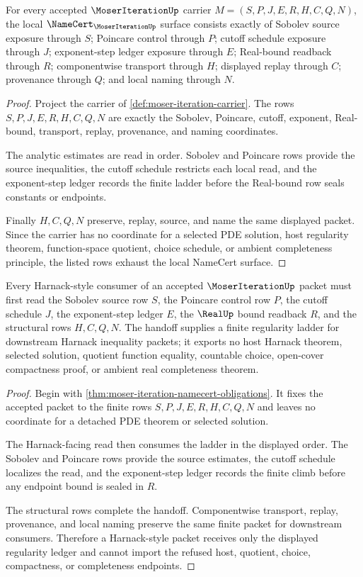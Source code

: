 \begin{theorem}
\label{thm:moser-iteration-namecert-obligations}
For every accepted $\MoserIterationUp$ carrier $M=(S,P,J,E,R,H,C,Q,N)$, the local $\NameCert_{\MoserIterationUp}$ surface consists exactly of Sobolev source exposure through $S$; Poincare control through $P$; cutoff schedule exposure through $J$; exponent-step ledger exposure through $E$; Real-bound readback through $R$; componentwise transport through $H$; displayed replay through $C$; provenance through $Q$; and local naming through $N$.
\end{theorem}
\begin{proof}
Project the carrier of \autoref{def:moser-iteration-carrier}. The rows $S,P,J,E,R,H,C,Q,N$ are exactly the Sobolev, Poincare, cutoff, exponent, Real-bound, transport, replay, provenance, and naming coordinates.

The analytic estimates are read in order. Sobolev and Poincare rows provide the source inequalities, the cutoff schedule restricts each local read, and the exponent-step ledger records the finite ladder before the Real-bound row seals constants or endpoints.

Finally $H,C,Q,N$ preserve, replay, source, and name the same displayed packet. Since the carrier has no coordinate for a selected PDE solution, host regularity theorem, function-space quotient, choice schedule, or ambient completeness principle, the listed rows exhaust the local NameCert surface.
\end{proof}

\begin{theorem}
\label{thm:moser-iteration-harnack-handoff}
Every Harnack-style consumer of an accepted $\MoserIterationUp$ packet must first read the Sobolev source row $S$, the Poincare control row $P$, the cutoff schedule $J$, the exponent-step ledger $E$, the $\RealUp$ bound readback $R$, and the structural rows $H,C,Q,N$. The handoff supplies a finite regularity ladder for downstream Harnack inequality packets; it exports no host Harnack theorem, selected solution, quotient function equality, countable choice, open-cover compactness proof, or ambient real completeness theorem.
\end{theorem}
\begin{proof}
Begin with \autoref{thm:moser-iteration-namecert-obligations}. It fixes the accepted packet to the finite rows $S,P,J,E,R,H,C,Q,N$ and leaves no coordinate for a detached PDE theorem or selected solution.

The Harnack-facing read then consumes the ladder in the displayed order. The Sobolev and Poincare rows provide the source estimates, the cutoff schedule localizes the read, and the exponent-step ledger records the finite climb before any endpoint bound is sealed in $R$.

The structural rows complete the handoff. Componentwise transport, replay, provenance, and local naming preserve the same finite packet for downstream consumers. Therefore a Harnack-style packet receives only the displayed regularity ledger and cannot import the refused host, quotient, choice, compactness, or completeness endpoints.
\end{proof}

